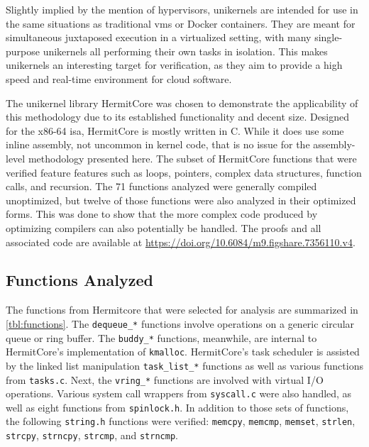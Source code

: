 Slightly implied by the mention of hypervisors,
unikernels are intended for use in the same situations as traditional \acp{vm}
or Docker containers.
They are meant for simultaneous juxtaposed execution in a virtualized setting,
with many single-purpose unikernels all performing their own tasks in isolation.
This makes unikernels an interesting target for verification,
as they aim to provide a high speed and real-time environment for cloud software.

The unikernel library HermitCore was chosen
to demonstrate the applicability of this methodology
due to its established functionality and decent size.
Designed for the x86-64 \ac{isa}, HermitCore is mostly written in C.
While it does use some inline assembly, not uncommon in kernel code,
that is no issue for the assembly-level methodology presented here.
The subset of HermitCore functions that were verified feature features
such as loops, pointers, complex data structures, function calls, and recursion.
The 71 functions analyzed were generally compiled unoptimized,
but twelve of those functions were also analyzed in their optimized forms.
This was done to show that the more complex code produced by optimizing compilers
can also potentially be handled.
The proofs and all associated code
are available at \url{https://doi.org/10.6084/m9.figshare.7356110.v4}.

\subsection{Functions Analyzed}
The functions from Hermitcore that were selected for analysis are summarized in \cref{tbl:functions}.
The \lstinline|dequeue_*| functions involve operations on a generic circular queue or ring buffer.
The \lstinline|buddy_*| functions, meanwhile,
are internal to HermitCore's implementation of \lstinline|kmalloc|.
HermitCore's task scheduler is assisted by the linked list manipulation \lstinline|task_list_*| functions
as well as various functions from \lstinline|tasks.c|.
Next, the \lstinline|vring_*| functions are involved with virtual I/O operations.
Various system call wrappers from \lstinline|syscall.c| were also handled,
as well as eight functions from \lstinline|spinlock.h|.
In addition to those sets of functions,
the following \lstinline|string.h| functions were verified:
\lstinline|memcpy|, \lstinline|memcmp|, \lstinline|memset|, \lstinline|strlen|,
\lstinline|strcpy|, \lstinline|strncpy|, \lstinline|strcmp|, and \lstinline|strncmp|.

